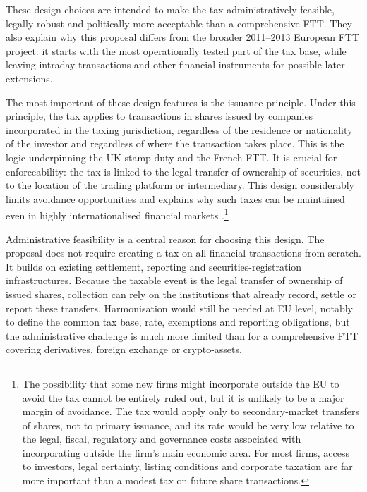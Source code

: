 \documentclass[../../main]{subfiles}
\begin{document}
These design choices are intended to make the tax administratively feasible, legally robust and politically more acceptable than a comprehensive FTT. They also explain why this proposal differs from the broader 2011--2013 European FTT project: it starts with the most operationally tested part of the tax base, while leaving intraday transactions and other financial instruments for possible later extensions.


The most important of these design features is the issuance principle. Under this principle, the tax applies to transactions in shares issued by companies incorporated in the taxing jurisdiction, regardless of the residence or nationality of the investor and regardless of where the transaction takes place. This is the logic underpinning the UK stamp duty and the French FTT. It is crucial for enforceability: the tax is linked to the legal transfer of ownership of securities, not to the location of the trading platform or intermediary. This design considerably limits avoidance opportunities and explains why such taxes can be maintained even in highly internationalised financial markets \citep{CapelleBlancardPersaud2025}.\footnote{The possibility that some new firms might incorporate outside the EU to avoid the tax cannot be entirely ruled out, but it is unlikely to be a major margin of avoidance. The tax would apply only to secondary-market transfers of shares, not to primary issuance, and its rate would be very low relative to the legal, fiscal, regulatory and governance costs associated with incorporating outside the firm's main economic area. For most firms, access to investors, legal certainty, listing conditions and corporate taxation are far more important than a modest tax on future share transactions.}


Administrative feasibility is a central reason for choosing this design. The proposal does not require creating a tax on all financial transactions from scratch. It builds on existing settlement, reporting and securities-registration infrastructures. Because the taxable event is the legal transfer of ownership of issued shares, collection can rely on the institutions that already record, settle or report these transfers. Harmonisation would still be needed at EU level, notably to define the common tax base, rate, exemptions and reporting obligations, but the administrative challenge is much more limited than for a comprehensive FTT covering derivatives, foreign exchange or crypto-assets.
\end{document}
